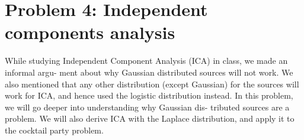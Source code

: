 \documentclass{article}
\begin{document}






\section*{Problem 4: Independent components analysis}

While studying Independent Component Analysis (ICA) in class, we made an informal argu- ment about why Gaussian distributed sources will not work. We also mentioned that any other distribution (except Gaussian) for the sources will work for ICA, and hence used the logistic distribution instead. In this problem, we will go deeper into understanding why Gaussian dis- tributed sources are a problem. We will also derive ICA with the Laplace distribution, and apply it to the cocktail party problem.
\end{document}
